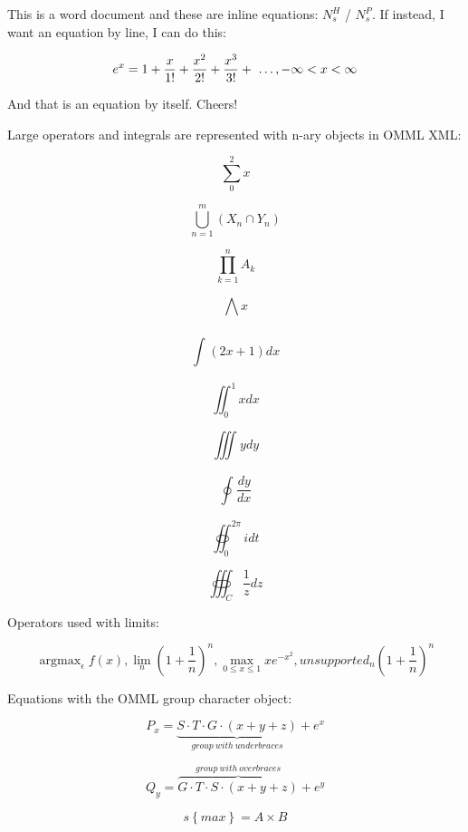\documentclass[11pt,a4paper]{article}
\begin{document}
This is a word document and these are inline equations:  $N_{s}^{H}$ / $N_{s}^{P}$ ​. If instead, I want an equation by line, I can do this:

$$e^{x}=1+\frac{x}{1!}+\frac{x^{2}}{2!}+\frac{x^{3}}{3!}+ \text{ \textellipsis } , - \infty  < x <  \infty$$

And that is an equation by itself. Cheers!

Large operators and integrals are represented with n-ary objects in OMML XML:

$$\sum_{0}^{2}x$$

$$\bigcup_{n=1}^{m}\left(X_{n} \cap Y_{n}\right)$$

$$\prod_{k=1}^{n}A_{k}$$

$$\bigwedge_{}^{}x$$

$$\int_{}^{}(2x+1)dx$$

$$\iint_{0}^{1}xdx$$

$$\iiint_{}^{}ydy$$

$$\oint_{}^{}\frac{dy}{dx}$$

$$\oiint_{0}^{2 \pi }idt$$

$$\oiiint_{C}^{}\frac{1}{z}dz$$

Operators used with limits:

$$\operatorname{argmax}_{ \epsilon}f(x),   \lim_{n}{\left(1+\frac{1}{n}\right)}^{n} ,  \max_{0 \leq x \leq 1}xe^{-x^{2}},  unsupported_{n}{\left(1+\frac{1}{n}\right)}^{n}$$

Equations with the OMML group character object:

$$P_{ x}=\underbrace{S \cdot T \cdot G \cdot (x+y+z)}_{group\ with\ underbraces}+e^{x}$$

$$Q_{ y}=\overset{group\ with\ overbraces}{\overbrace{G \cdot T \cdot S \cdot (x+y+z)}}+e^{y}$$

$$s\left\{max\right\}= A \times B$$
\end{document}
